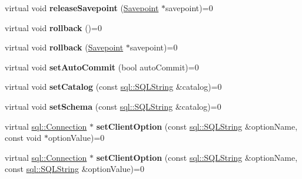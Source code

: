 \begin{DoxyCompactItemize}
\item 
\hypertarget{classsql_1_1_connection_af63b6bf5ad113035594c5cf2a7e50493}{}\label{classsql_1_1_connection_af63b6bf5ad113035594c5cf2a7e50493} 
virtual void {\bfseries release\+Savepoint} (\hyperlink{classsql_1_1_savepoint}{Savepoint} $\ast$savepoint)=0
\item 
\hypertarget{classsql_1_1_connection_a46e4986f74a1f4055f6dfe4ccbf6b472}{}\label{classsql_1_1_connection_a46e4986f74a1f4055f6dfe4ccbf6b472} 
virtual void {\bfseries rollback} ()=0
\item 
\hypertarget{classsql_1_1_connection_aab86022062e265e1d4a9a7c44c2ca354}{}\label{classsql_1_1_connection_aab86022062e265e1d4a9a7c44c2ca354} 
virtual void {\bfseries rollback} (\hyperlink{classsql_1_1_savepoint}{Savepoint} $\ast$savepoint)=0
\item 
\hypertarget{classsql_1_1_connection_a26fc98c84ea562b77992d0995a2808e5}{}\label{classsql_1_1_connection_a26fc98c84ea562b77992d0995a2808e5} 
virtual void {\bfseries set\+Auto\+Commit} (bool auto\+Commit)=0
\item 
\hypertarget{classsql_1_1_connection_ad0ebcbb493f92eaaaa6eabafc3067b7e}{}\label{classsql_1_1_connection_ad0ebcbb493f92eaaaa6eabafc3067b7e} 
virtual void {\bfseries set\+Catalog} (const \hyperlink{classsql_1_1_s_q_l_string}{sql\+::\+S\+Q\+L\+String} \&catalog)=0
\item 
\hypertarget{classsql_1_1_connection_a5e633c562d8e057c0809d3024ec55788}{}\label{classsql_1_1_connection_a5e633c562d8e057c0809d3024ec55788} 
virtual void {\bfseries set\+Schema} (const \hyperlink{classsql_1_1_s_q_l_string}{sql\+::\+S\+Q\+L\+String} \&catalog)=0
\item 
\hypertarget{classsql_1_1_connection_a971ffff0d1742cb7f9ed76fa2f3b0eb3}{}\label{classsql_1_1_connection_a971ffff0d1742cb7f9ed76fa2f3b0eb3} 
virtual \hyperlink{classsql_1_1_connection}{sql\+::\+Connection} $\ast$ {\bfseries set\+Client\+Option} (const \hyperlink{classsql_1_1_s_q_l_string}{sql\+::\+S\+Q\+L\+String} \&option\+Name, const void $\ast$option\+Value)=0
\item 
\hypertarget{classsql_1_1_connection_ae648a3fa3a755ccd9613d9fbd6980afe}{}\label{classsql_1_1_connection_ae648a3fa3a755ccd9613d9fbd6980afe} 
virtual \hyperlink{classsql_1_1_connection}{sql\+::\+Connection} $\ast$ {\bfseries set\+Client\+Option} (const \hyperlink{classsql_1_1_s_q_l_string}{sql\+::\+S\+Q\+L\+String} \&option\+Name, const \hyperlink{classsql_1_1_s_q_l_string}{sql\+::\+S\+Q\+L\+String} \&option\+Value)=0
\item 

\end{DoxyCompactItemize}

